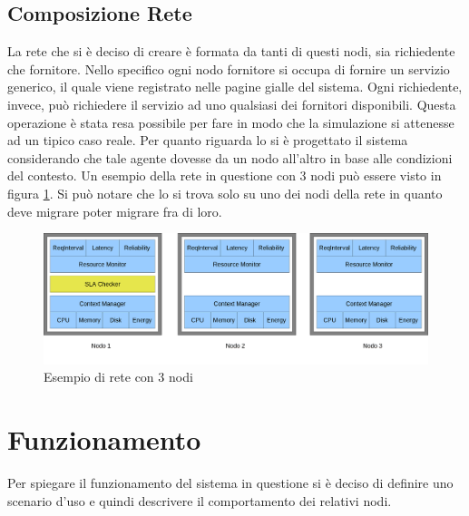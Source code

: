 \subsection{Composizione Rete}
La rete che si è deciso di creare è formata da tanti di questi nodi, sia richiedente che fornitore. Nello specifico ogni nodo fornitore si occupa di fornire un servizio generico, il quale viene registrato nelle pagine gialle del sistema. Ogni richiedente, invece, può richiedere il servizio ad uno qualsiasi dei fornitori disponibili. Questa operazione è stata resa possibile per fare in modo che la simulazione si attenesse ad un tipico caso reale. Per quanto riguarda lo  si è progettato il sistema considerando che tale agente dovesse  da un nodo all'altro in base alle condizioni del contesto. Un esempio della rete in questione con 3 nodi può essere visto in figura \ref{rete}. Si può notare che lo  si trova solo su uno dei nodi della rete in quanto deve migrare poter migrare fra di loro.
\begin{figure}[H]
\begin{center}
\includegraphics[scale=0.23]{etc/rete.png}
\caption{Esempio di rete con 3 nodi}
\label{rete}
\end{center}
\end{figure}
\section{Funzionamento}
Per spiegare il funzionamento del sistema in questione si è deciso di definire uno scenario d'uso e quindi descrivere il comportamento dei relativi nodi.
